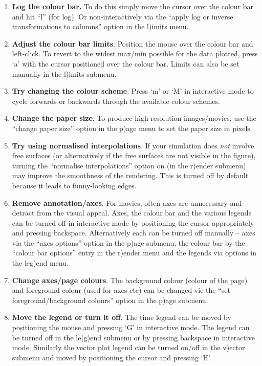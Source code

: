 \documentclass[a4paper,10pt]{article}
\begin{document}
\begin{enumerate}
\item {\bf Log the colour bar.} To do this simply move the cursor over the colour bar and hit ``l'' (for log). Or non-interactively via the ``apply log or inverse transformations to columns'' option in the l)imits menu.
\item {\bf Adjust the colour bar limits}. Position the mouse over the colour bar and left-click. To revert to the widest max/min possible for the data plotted, press `a' with the cursor positioned over the colour bar. Limits can also be set manually in the l)imits submenu.
\item {\bf Try changing the colour scheme}. Press `m' or `M' in interactive mode to cycle forwards or backwards through the available colour schemes.
\item {\bf Change the paper size}. To produce high-resolution images/movies, use the ``change paper size'' option in the p)age menu to set the paper size in pixels.
\item {\bf Try using normalised interpolations}. If your simulation does \emph{not} involve free surfaces (or alternatively if the free surfaces are not visible in the figure), turning the ``normalise interpolations'' option on (in the r)ender submenu) may improve the smoothness of the rendering. This is turned off by default because it leads to funny-looking edges.
\item {\bf Remove annotation/axes}. For movies, often axes are unnecessary and detract from the visual appeal. Axes, the colour bar and the various legends can be turned off in interactive mode by positioning the cursor appropriately and pressing backspace. Alternatively each can be turned off manually -- axes via the ``axes options'' option in the p)age submenu; the colour bar by the ``colour bar options'' entry in the r)ender menu and the legends via options in the leg)end menu.
\item {\bf Change axes/page colours}. The background colour (colour of the page) and foreground colour (used for axes etc) can be changed vie the ``set foreground/background colours'' option in the p)age submenu. 
\item {\bf Move the legend or turn it off}. The time legend can be moved by positioning the mouse and pressing `G' in interactive mode. The legend can be turned off in the le(g)end submenu or by pressing backspace in interactive mode. Similarly the vector plot legend can be turned on/off in the v)ector submenu and moved by positioning the cursor and pressing `H'.

\end{enumerate}
\end{document}
